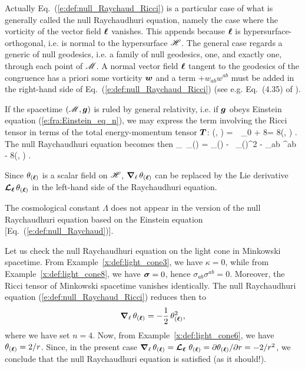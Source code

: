 {{\begin{remark}
Actually Eq.~(\ref{e:def:null_Raychaud_Ricci}) is a particular case of
what is generally called the null Raychaudhuri equation, namely the case where
the vorticity of the vector field $\bm{\ell}$ vanishes. This
appends because $\bm{\ell}$ is hypersurface-orthogonal, i.e. is normal to the
hypersurface $\mathscr{H}$. The general case regards a generic
 of null
geodesics, i.e. a family of null geodesics, one, and exactly one, through
each point of $\mathscr{M}$. A normal vector field $\bm{\ell}$ tangent to the geodesics
of the congruence has a priori some vorticity $\bm{w}$ and a term
$+w_{ab} w^{ab}$ must be added in the right-hand side of
Eq.~(\ref{e:def:null_Raychaud_Ricci}) (see e.g. Eq.~(4.35) of \cite{HawkiE73}).
\end{remark}

If the spacetime $(\mathscr{M},\bm{g})$ is ruled by general relativity, i.e. if
$\bm{g}$ obeys Einstein equation (\ref{e:fra:Einstein_eq_n}), we may express
the term involving the Ricci tensor in terms of the total energy-momentum tensor
$\bm{T}$:
\be \label{e:def:Rll_Tll}
  (\wl, \wl)  = \,\Lambda\,  _{0}
    + 8\pi {}
    = 8\pi {}(\wl, \wl) .
\ee
The null Raychaudhuri equation becomes then
\be \label{e:def:null_Raychaud}
     \wnab_{\el}\,  \theta_{(\wl)} = \kappa \theta_{(\wl)}
        -  \, \theta_{(\wl)}^2 - \sigma_{ab} \sigma^{ab}
        - 8\pi {}(\wl, \wl) .
\ee

\begin{remark}
Since $\theta_{(\bm{\ell})}$ is a scalar field on $\mathscr{H}$, $\bm{\nabla}_{\ell}\,  \theta_{(\bm{\ell})}$
can be replaced by the Lie derivative $\bm{\mathcal{L}}_{\bm{\bm{\ell}}}\, \theta_{(\bm{\ell})}$ in the left-hand side of the Raychaudhuri
equation.
\end{remark}

\begin{remark}
The cosmological constant $\Lambda$ does not appear in the version
of the null Raychaudhuri equation based on the Einstein equation [Eq.~(\ref{e:def:null_Raychaud})].
\end{remark}


\begin{example}
Let us check the null Raychaudhuri equation on the light cone in Minkowski
spacetime. From Example~\ref{x:def:light_cone3}, we have $\kappa=0$, while
from Example~\ref{x:def:light_cone8}, we have $\bm{\sigma}=0$,
hence $\sigma_{ab} \sigma^{ab}=0$. Moreover, the Ricci tensor of Minkowski
spacetime vanishes identically. The null Raychaudhuri equation
(\ref{e:def:null_Raychaud_Ricci})
reduces then to
\[
    \bm{\nabla}_{\ell}\,  \theta_{(\bm{\ell})} =  - \frac{1}{2} \, \theta_{(\bm{\ell})}^2 ,
\]
where we have set $n=4$. Now, from Example~\ref{x:def:light_cone6}, we
have $\theta_{(\bm{\ell})} = 2/r$. Since, in the present case
$\bm{\nabla}_{\ell}\,  \theta_{(\bm{\ell})}  = \bm{\mathcal{L}}_{\bm{\ell}}\, \,  \theta_{(\bm{\ell})}  = {\partial \theta_{(\bm{\ell})}}/{\partial r} =
- 2/r^2$, we conclude that the null Raychaudhuri equation is satisfied (as
it should!).
\end{example}

}}
